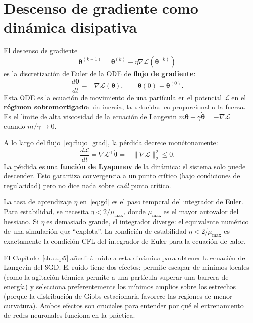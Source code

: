 \section{Descenso de gradiente como dinámica disipativa}
\label{sec:gd_dinamica}


El descenso de gradiente
\begin{equation}
  \bm{\theta}^{(k+1)} = \bm{\theta}^{(k)}
  - \eta\nabla\mathcal{L}(\bm{\theta}^{(k)})
  \label{eq:gd}
\end{equation}
es la discretización de Euler de la ODE de \textbf{flujo de gradiente}:
\begin{equation}
  \frac{d\bm{\theta}}{dt} = -\nabla\mathcal{L}(\bm{\theta}),
  \qquad \bm{\theta}(0) = \bm{\theta}^{(0)}.
  \label{eq:flujo_grad}
\end{equation}
Esta ODE es la ecuación de movimiento de una partícula en el potencial
$\mathcal{L}$ en el \textbf{régimen sobremortigado}: sin inercia, la
velocidad es proporcional a la fuerza. Es el límite de alta viscosidad
de la ecuación de Langevin $m\ddot{\bm{\theta}} + \gamma\dot{\bm{\theta}}
= -\nabla\mathcal{L}$ cuando $m/\gamma \to 0$.

A lo largo del flujo~\eqref{eq:flujo_grad}, la pérdida decrece
monótonamente:
\begin{equation}
  \frac{d\mathcal{L}}{dt}
  = \nabla\mathcal{L}^\top \dot{\bm{\theta}}
  = -\|\nabla\mathcal{L}\|_2^2 \leq 0.
  \label{eq:lyapunov}
\end{equation}
La pérdida es una \textbf{función de Lyapunov} de la dinámica: el
sistema solo puede descender. Esto garantiza convergencia a un punto
crítico (bajo condiciones de regularidad) pero no dice nada sobre
\emph{cuál} punto crítico.

La tasa de aprendizaje $\eta$ en~\eqref{eq:gd} es el paso temporal del
integrador de Euler. Para estabilidad, se necesita $\eta < 2/\mu_{\max}$,
donde $\mu_{\max}$ es el mayor autovalor del hessiano. Si $\eta$ es
demasiado grande, el integrador diverge: el equivalente numérico de una
simulación que ``explota''. La condición de estabilidad
$\eta < 2/\mu_{\max}$ es exactamente la condición CFL del integrador de
Euler para la ecuación de calor.

El Capítulo~\ref{ch:cap5} añadirá ruido a esta dinámica para obtener la
ecuación de Langevin del SGD. El ruido tiene dos efectos: permite escapar
de mínimos locales (como la agitación térmica permite a una partícula
superar una barrera de energía) y selecciona preferentemente los mínimos
amplios sobre los estrechos (porque la distribución de Gibbs estacionaria
favorece las regiones de menor curvatura). Ambos efectos son cruciales
para entender por qué el entrenamiento de redes neuronales funciona en
la práctica.

